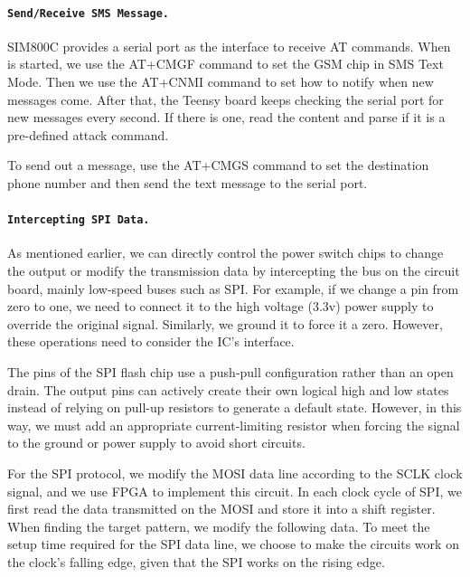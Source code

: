 \paragraph{\textbf{\texttt{Send/Receive SMS Message.}}} SIM800C provides a serial port as the interface to receive AT commands. When \name is started, we use the AT+CMGF command to set the GSM chip in SMS Text Mode. Then we use the AT+CNMI command to set how to notify when new messages come. After that, the Teensy board keeps checking the serial port for new messages every second. If there is one, read the content and parse if it is a pre-defined attack command.

To send out a message, use the AT+CMGS command to set the destination phone number and then send the text message to the serial port. 


\paragraph{\textbf{\texttt{Intercepting SPI Data.}}} As mentioned earlier, we can directly control the power switch chips to change the output or modify the transmission data by intercepting the bus on the circuit board, mainly low-speed buses such as SPI. For example, if we change a pin from zero to one, we need to connect it to the high voltage (3.3v) power supply to override the original signal. Similarly, we ground it to force it a zero. 
However, these operations need to consider the IC's interface.

The pins of the SPI flash chip use a push-pull configuration rather than an open drain. The output pins can actively create their own logical high and low states instead of relying on pull-up resistors to generate a default state. However, in this way, we must add an appropriate current-limiting resistor when forcing the signal to the ground or power supply to avoid short circuits.

For the SPI protocol, we modify the MOSI data line according to the SCLK clock signal, and we use FPGA to implement this circuit. In each clock cycle of SPI, we first read the data transmitted on the MOSI and store it into a shift register. When finding the target pattern, we modify the following data. To meet the setup time required for the SPI data line, we choose to make the circuits work on the clock's falling edge, given that the SPI works on the rising edge.
